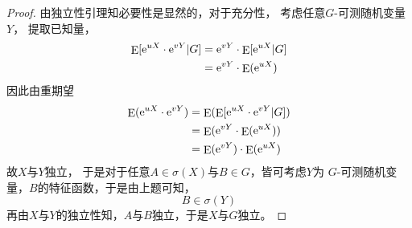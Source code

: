 \documentclass[cn]{homework}
\DeclareMathOperator{\E}{E}
\begin{document}
\begin{subproblem}
        \item
        \begin{proof}
            由独立性引理知必要性是显然的，对于充分性，
            考虑任意$G$-可测随机变量$Y$，
            提取已知量，
            \[\begin{aligned}
                \E[\e^{uX}\cdot\e^{vY}|G]&=\e^{vY}\cdot\E[\e^{uX}|G]\\
                &=\e^{vY}\cdot\E(\e^{uX})
            \end{aligned}\]
            因此由重期望
            \[\begin{aligned}
                \E(\e^{uX}\cdot\e^{vY})&=\E(\E[\e^{uX}\cdot\e^{vY}|G])\\
                &=\E(\e^{vY}\cdot\E(\e^{uX}))\\
                &=\E(\e^{vY})\cdot\E(\e^{uX})
            \end{aligned}\]
            故$X$与$Y$独立，
            于是对于任意$A\in\sigma(X)$与$B\in G$，皆可考虑$Y$为
            $G$-可测随机变量，$B$的特征函数，于是由上题可知，
            \[B\in\sigma(Y)\]
            再由$X$与$Y$的独立性知，$A$与$B$独立，于是$X$与$G$独立。
        \end{proof}
    \end{subproblem}
\end{document}
